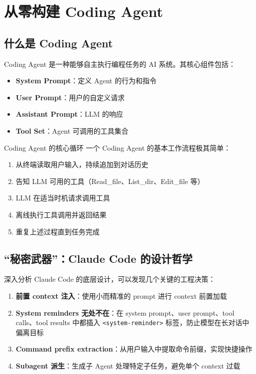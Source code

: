 \section{从零构建 Coding Agent}

\subsection{什么是 Coding Agent}

Coding Agent 是一种能够自主执行编程任务的 AI 系统。其核心组件包括：

\begin{itemize}
    \item \textbf{System Prompt}：定义 Agent 的行为和指令
    \item \textbf{User Prompt}：用户的自定义请求
    \item \textbf{Assistant Prompt}：LLM 的响应
    \item \textbf{Tool Set}：Agent 可调用的工具集合
\end{itemize}

\begin{importantbox}{Coding Agent 的核心循环}
一个 Coding Agent 的基本工作流程极其简单：
\begin{enumerate}
    \item 从终端读取用户输入，持续追加到对话历史
    \item 告知 LLM 可用的工具（Read\_file、List\_dir、Edit\_file 等）
    \item LLM 在适当时机请求调用工具
    \item 离线执行工具调用并返回结果
    \item 重复上述过程直到任务完成
\end{enumerate}
\end{importantbox}

\subsection{``秘密武器''：Claude Code 的设计哲学}

深入分析 Claude Code 的底层设计，可以发现几个关键的工程决策：

\begin{enumerate}
    \item \textbf{前置 context 注入}：使用小而精准的 prompt 进行 context 前置加载
    \item \textbf{System reminders 无处不在}：在 system prompt、user prompt、tool calls、tool results 中都插入 \texttt{<system-reminder>} 标签，防止模型在长对话中偏离目标
    \item \textbf{Command prefix extraction}：从用户输入中提取命令前缀，实现快捷操作
    \item \textbf{Subagent 派生}：生成子 Agent 处理特定子任务，避免单个 context 过载
\end{enumerate}

